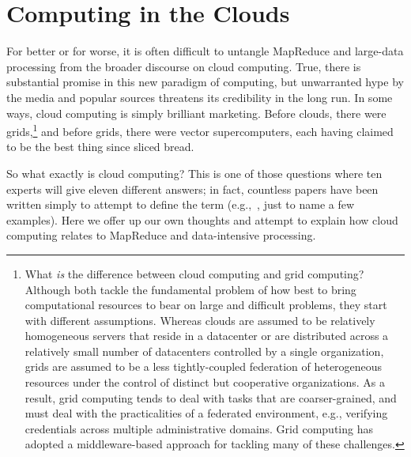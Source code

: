 \section{Computing in the Clouds}
\label{chapter1:clouds}

For better or for worse, it is often difficult to untangle MapReduce
and large-data processing from the broader discourse on cloud
computing.  True, there is substantial promise in this new paradigm of
computing, but unwarranted hype by the media and popular sources
threatens its credibility in the long run.  In some ways, cloud
computing is simply brilliant marketing.  Before clouds, there were
grids,\footnote{What \emph{is} the difference between cloud computing
  and grid computing?  Although both tackle the fundamental problem of
  how best to bring computational resources to bear on large and
  difficult problems, they start with different assumptions.  Whereas
  clouds are assumed to be relatively homogeneous servers that reside
  in a datacenter or are distributed across a relatively small number
  of datacenters controlled by a single organization, grids are
  assumed to be a less tightly-coupled federation of heterogeneous
  resources under the control of distinct but cooperative
  organizations.  As a result, grid computing tends to deal with tasks
  that are coarser-grained, and must deal with the practicalities of a
  federated environment, e.g., verifying credentials across multiple
  administrative domains.  Grid computing has adopted a
  middleware-based approach for tackling many of these challenges.}
and before grids, there were vector supercomputers, each having
claimed to be the best thing since sliced bread.

So what exactly is cloud computing?  This is one of those questions
where ten experts will give eleven different answers; in fact,
countless papers have been written simply to attempt to define the
term
(e.g.,~\cite{Armbrust_etal_2009,Buyya_etal_2009,Vaquero_etal_2009},
just to name a few examples).  Here we offer up our own thoughts and
attempt to explain how cloud computing relates to MapReduce and
data-intensive processing.

